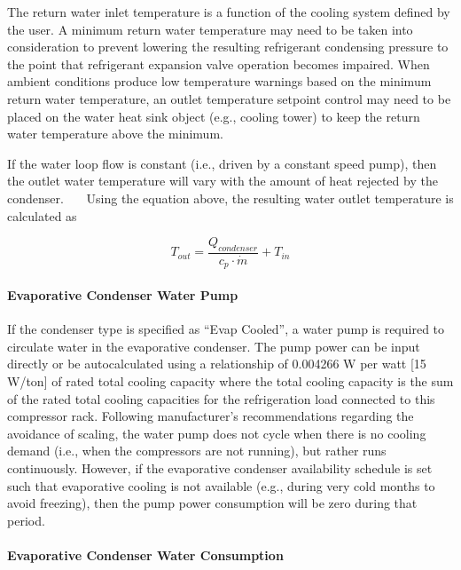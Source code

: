 The return water inlet temperature is a function of the cooling system defined by the user. A minimum return water temperature may need to be taken into consideration to prevent lowering the resulting refrigerant condensing pressure to the point that refrigerant expansion valve operation becomes impaired. When ambient conditions produce low temperature warnings based on the minimum return water temperature, an outlet temperature setpoint control may need to be placed on the water heat sink object (e.g., cooling tower) to keep the return water temperature above the minimum.

If the water loop flow is constant (i.e., driven by a constant speed pump), then the outlet water temperature will vary with the amount of heat rejected by the condenser.~~~ Using the equation above, the resulting water outlet temperature is calculated as

\begin{equation}
{T_{out}} = \frac{{{Q_{condenser}}}}{{{c_p} \cdot \dot{m}}} + {T_{in}}
\end{equation}

\paragraph{Evaporative Condenser Water Pump}\label{evaporative-condenser-water-pump}

If the condenser type is specified as ``Evap Cooled'', a water pump is required to circulate water in the evaporative condenser. The pump power can be input directly or be autocalculated using a relationship of 0.004266 W per watt {[}15 W/ton{]} of rated total cooling capacity where the total cooling capacity is the sum of the rated total cooling capacities for the refrigeration load connected to this compressor rack. Following manufacturer's recommendations regarding the avoidance of scaling, the water pump does not cycle when there is no cooling demand (i.e., when the compressors are not running), but rather runs continuously. However, if the evaporative condenser availability schedule is set such that evaporative cooling is not available (e.g., during very cold months to avoid freezing), then the pump power consumption will be zero during that period.

\paragraph{Evaporative Condenser Water Consumption}\label{evaporative-condenser-water-consumption}

